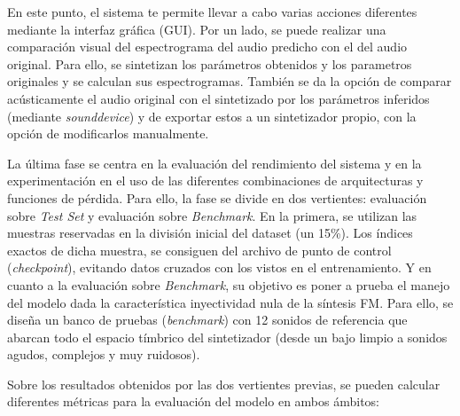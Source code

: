 \documentclass[12pt, a4paper]{article}
\begin{document}
En este punto, el sistema te permite llevar a cabo varias acciones diferentes mediante la 
interfaz gráfica (GUI). Por un lado, se puede realizar una comparación visual del espectrograma del audio
predicho con el del audio original. Para ello, se sintetizan los parámetros obtenidos y los parametros originales y se 
calculan sus espectrogramas. También se da la opción de comparar acústicamente el audio original con el sintetizado por los parámetros
inferidos (mediante \textit{sounddevice}) y de exportar estos a un sintetizador propio, con la opción de modificarlos manualmente. 

La última fase se centra en la evaluación del rendimiento del sistema y en la experimentación en el uso de las
diferentes combinaciones de arquitecturas y funciones de pérdida. Para ello, la fase se divide en dos vertientes:
evaluación sobre \textit{Test Set} y evaluación sobre \textit{Benchmark}. En la primera, se utilizan las muestras reservadas en la división inicial del dataset (un 15\%).
Los índices exactos de dicha muestra, se consiguen del archivo de punto de control (\textit{checkpoint}), evitando datos cruzados 
con los vistos en el entrenamiento. Y en cuanto a la evaluación sobre \textit{Benchmark}, su objetivo 
es poner a prueba el manejo del modelo dada la característica inyectividad nula de la síntesis FM. Para
ello, se diseña un banco de pruebas (\textit{benchmark}) con 12 sonidos de referencia que abarcan todo el espacio tímbrico
del sintetizador (desde un bajo limpio a sonidos agudos, complejos y muy ruidosos).

Sobre los resultados obtenidos por las dos vertientes previas, se pueden calcular diferentes métricas
para la evaluación del modelo en ambos ámbitos:
\end{document}
